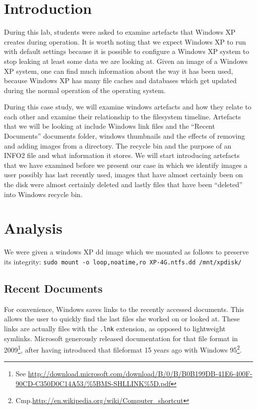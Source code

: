 \documentclass[a4paper,
    11pt,
    normalheadings,
    parindent,
    UKenglish,
    abstracton,
    ]{scrartcl}
\title{\mytitle{}}
\author{
    cand. Dipl. Inf. Tobias Müller <\href{mailto:muellet2@computing.dcu.ie?subject=ss10-forensic-lab01}{muellet2@}>, 59212333 \and
    BSc. Anthony Walters <\href{mailto:waltersa3@computing.dcu.ie?subject=ss10-forensic-lab01}{waltersa3@}>, 59213102
    }
\date{\today}
\begin{document}
\maketitle


\section{Introduction}
During this lab, students were asked to examine artefacts that Windows XP creates during operation.
It is worth noting that we expect Windows XP to run with default settings because it is possible to configure a Windows XP system to stop leaking at least some data we are looking at.
Given an image of a Windows XP system, one can find much information about the way it has been used, because Windows XP has many file caches and databases which get updated during the normal operation of the operating system.

During this case study, we will examine windows artefacts and how they relate to each other and examine their relationship to the filesystem timeline. Artefacts that we will be looking at include Windows link files and the ``Recent Documents'' documents folder, windows thumbnails and the effects of removing and adding images from a directory. The recycle bin  and the  purpose of an INFO2 file and what information it stores. We will start introducing  artefacts that we have examined before we present our case in which we identify
images a user possibly has last recently used, images that have almost certainly been on the disk were almost certainly deleted
and lastly files that have been ``deleted'' into Windows recycle bin.



\section{Analysis}

We were given a windows XP dd image which we mounted as follows to preserve its integrity: \verb|sudo mount -o loop,noatime,ro XP-4G.ntfs.dd /mnt/xpdisk/|


\subsection{Recent Documents}
For convenience, Windows saves links to the recently accessed documents.
This allows the user to quickly find the last files she worked on or looked at.
These links are actually files with the \texttt{.lnk} extension, as opposed to lightweight symlinks.
Microsoft generously released documentation for that file format in 2009\footnote{See \url{http://download.microsoft.com/download/B/0/B/B0B199DB-41E6-400F-90CD-C350D0C14A53/\%5BMS-SHLLINK\%5D.pdf}},
after having introduced that fileformat 15 years ago with Windows 95\footnote{Cmp.\url{http://en.wikipedia.org/wiki/Computer_shortcut}}.
\end{document}
